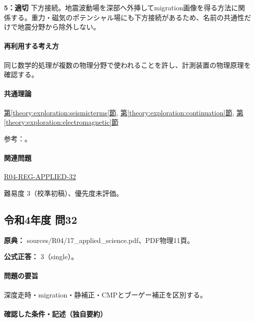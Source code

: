 \noindent\textbf{5：適切} 下方接続。地震波動場を深部へ外挿してmigration画像を得る方法に関係する。重力・磁気のポテンシャル場にも下方接続があるため、名前の共通性だけで地震分野から除外しない。\par

\paragraph{再利用する考え方} 同じ数学的処理が複数の物理分野で使われることを許し、計測装置の物理原理を確認する。

\paragraph{共通理論} \hyperref[theory:exploration:seismicterms]{第\ref*{theory:exploration:seismicterms}節}, \hyperref[theory:exploration:continuation]{第\ref*{theory:exploration:continuation}節}, \hyperref[theory:exploration:electromagnetic]{第\ref*{theory:exploration:electromagnetic}節}

\par 参考：\cite{usgs_refraction2013,epa_seismic_reflection,usgs_static2004,usgs_processing2000,stanford_downward2001,rigid_boom2019}。

\paragraph{関連問題} \hyperref[q:r04-reg-applied-32]{R04-REG-APPLIED-32}

\par 難易度 3（校準初稿）、優先度未評価。

\subsection{令和4年度 問32}
\label{q:r04-reg-applied-32}

\noindent\textbf{原典：} sources/R04/17\_applied\_science.pdf、PDF物理11頁。

\textbf{公式正答：} 3（single）。

\paragraph{問題の要旨} 深度走時・migration・静補正・CMPとブーゲー補正を区別する。

\paragraph{確認した条件・記述（独自要約）}\mbox{}\par

